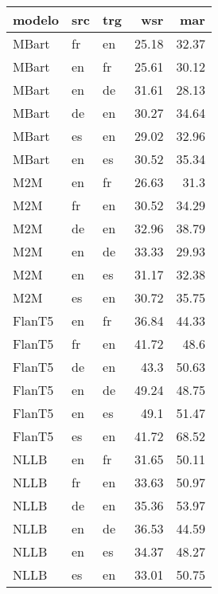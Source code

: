 \begin{tabular}{lllrr}
\hline
 modelo   & src   & trg   &   wsr &   mar \\
\hline
 MBart    & fr    & en    & 25.18 & 32.37 \\
 MBart    & en    & fr    & 25.61 & 30.12 \\
 MBart    & en    & de    & 31.61 & 28.13 \\
 MBart    & de    & en    & 30.27 & 34.64 \\
 MBart    & es    & en    & 29.02 & 32.96 \\
 MBart    & en    & es    & 30.52 & 35.34 \\
 M2M      & en    & fr    & 26.63 & 31.3  \\
 M2M      & fr    & en    & 30.52 & 34.29 \\
 M2M      & de    & en    & 32.96 & 38.79 \\
 M2M      & en    & de    & 33.33 & 29.93 \\
 M2M      & en    & es    & 31.17 & 32.38 \\
 M2M      & es    & en    & 30.72 & 35.75 \\
 FlanT5   & en    & fr    & 36.84 & 44.33 \\
 FlanT5   & fr    & en    & 41.72 & 48.6  \\
 FlanT5   & de    & en    & 43.3  & 50.63 \\
 FlanT5   & en    & de    & 49.24 & 48.75 \\
 FlanT5   & en    & es    & 49.1  & 51.47 \\
 FlanT5   & es    & en    & 41.72 & 68.52 \\
 NLLB     & en    & fr    & 31.65 & 50.11 \\
 NLLB     & fr    & en    & 33.63 & 50.97 \\
 NLLB     & de    & en    & 35.36 & 53.97 \\
 NLLB     & en    & de    & 36.53 & 44.59 \\
 NLLB     & en    & es    & 34.37 & 48.27 \\
 NLLB     & es    & en    & 33.01 & 50.75 \\
\hline
\end{tabular}